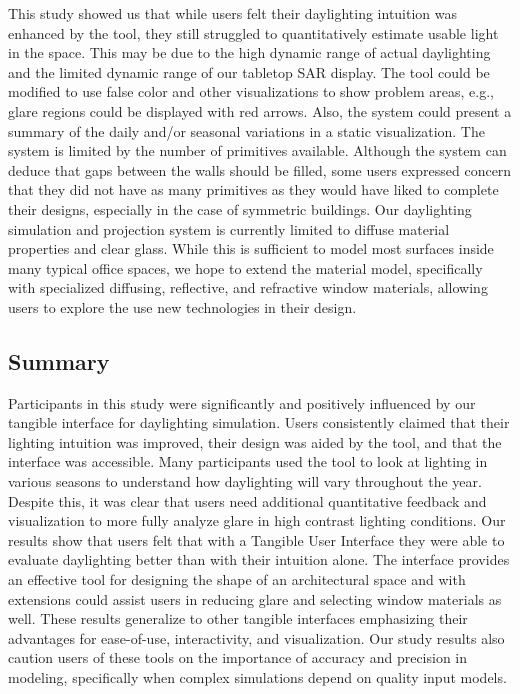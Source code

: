 This study showed us that while users felt their daylighting intuition
was enhanced by the tool, they still struggled to quantitatively
estimate usable light in the space.  This may be due to the high
dynamic range of actual daylighting and the limited dynamic range of
our tabletop SAR display.  The tool could be modified to use false
color and other visualizations to show problem areas, e.g., glare
regions could be displayed with red arrows.  Also, the system could
present a summary of the daily and/or seasonal variations in a static
visualization.  The system is limited by the number of primitives
available.  Although the system can deduce that gaps between the walls
should be filled, some users expressed concern that they did not have
as many primitives as they would have liked to complete their designs,
especially in the case of symmetric buildings.
%
Our daylighting simulation and projection system is currently limited
to diffuse material properties and clear glass.  While this is
sufficient to model most surfaces inside many typical office spaces,
we hope to extend the material model, specifically with specialized
diffusing, reflective, and refractive window materials, allowing users
to explore the use new technologies in their design.







\subsection{Summary}

Participants in this study were significantly and positively
influenced by our tangible interface for daylighting simulation.
Users consistently claimed that their lighting intuition was improved,
their design was aided by the tool, and that the interface was
accessible.  Many participants used the tool to look at lighting in
various seasons to understand how daylighting will vary throughout the
year.  Despite this, it was clear that users need additional
quantitative feedback and visualization to more fully analyze glare in
high contrast lighting conditions.  Our results show that users felt
that with a Tangible User Interface they were able to evaluate
daylighting better than with their intuition alone.  The interface
provides an effective tool for designing the shape of an architectural
space and with extensions could assist users in reducing glare and
selecting window materials as well.  These results generalize to other
tangible interfaces emphasizing their advantages for ease-of-use,
interactivity, and visualization.  Our study results also caution
users of these tools on the importance of accuracy and precision in
modeling, specifically when complex simulations depend on quality
input models.

